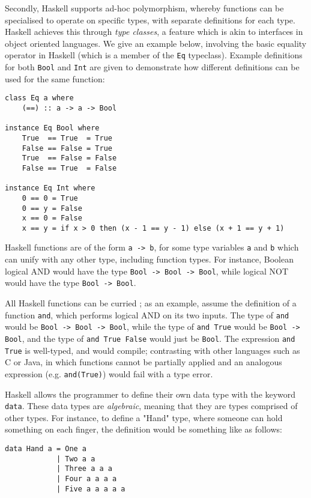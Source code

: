 \documentclass[12pt, a4paper, bibliography=totocnumbered]{scrreprt}
\newcommand{\inline}[1]{\lstinline[basicstyle=\ttfamily\footnotesize]{#1}}
\begin{document}
Secondly, Haskell supports ad-hoc polymorphism, whereby functions can be specialised to operate on specific types, with separate definitions for each type. Haskell achieves this through \emph{type classes}, a feature which is akin to interfaces in object oriented languages. We give an example below, involving the basic equality operator in Haskell (which is a member of the \inline{Eq} typeclass). Example definitions for both \inline{Bool} and \inline{Int} are given to demonstrate how different definitions can be used for the same function:

\begin{lstlisting}
class Eq a where
    (==) :: a -> a -> Bool

instance Eq Bool where
    True  == True  = True
    False == False = True
    True  == False = False
    False == True  = False

instance Eq Int where
    0 == 0 = True
    0 == y = False
    x == 0 = False
    x == y = if x > 0 then (x - 1 == y - 1) else (x + 1 == y + 1)
\end{lstlisting}

Haskell functions are of the form \inline{a -> b}, for some type variables \inline{a} and \inline{b} which can unify with any other type, including function types. For instance, Boolean logical AND would have the type \inline{Bool -> Bool -> Bool}, while logical NOT would have the type \inline{Bool -> Bool}.

All Haskell functions can be curried \cite{currying}; as an example, assume the definition of a function \inline{and}, which performs logical AND on its two inputs. The type of \inline{and} would be \inline{Bool -> Bool -> Bool}, while the type of \inline{and True} would be \inline{Bool -> Bool}, and the type of \inline{and True False} would just be \inline{Bool}. The expression \inline{and True} is well-typed, and would compile; contrasting with other languages such as C or Java, in which functions cannot be partially applied and an analogous expression (e.g. \inline{and(True)}) would fail with a type error.

Haskell allows the programmer to define their own data type with the keyword \inline{data}. These data types are \emph{algebraic}, meaning that they are types comprised of other types. For instance, to define a "Hand" type, where someone can hold something on each finger, the definition would be something like as follows:

\begin{lstlisting}
data Hand a = One a
            | Two a a
            | Three a a a
            | Four a a a a
            | Five a a a a a
\end{lstlisting}
\end{document}
